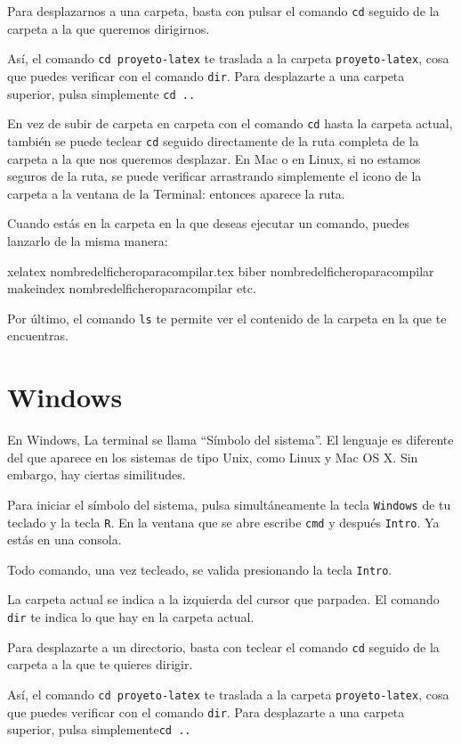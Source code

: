 Para desplazarnos a una carpeta, basta con pulsar el comando
\verb|cd| seguido de la carpeta a la que queremos dirigirnos.

Así, el comando \verb|cd proyeto-latex| te traslada a la carpeta \verb|proyeto-latex|, cosa que puedes verificar con el comando \verb|dir|. Para desplazarte a una carpeta superior, pulsa simplemente \verb|cd ..|

En vez de subir de carpeta en carpeta con el comando \verb|cd| hasta la carpeta actual, también se puede teclear \verb|cd| seguido directamente de la ruta completa de la carpeta a la que nos queremos desplazar. En Mac o en Linux, si no estamos seguros de la ruta, se puede verificar arrastrando simplemente el icono de la carpeta a la ventana de la Terminal: entonces aparece la ruta.

Cuando estás en la carpeta en la que deseas ejecutar un comando, puedes lanzarlo de la misma manera:

\begin{bashcode}
xelatex nombredelficheroparacompilar.tex
biber nombredelficheroparacompilar
makeindex nombredelficheroparacompilar
etc.
\end{bashcode}

Por último, el comando \verb|ls| te permite ver el contenido de la carpeta en la que te encuentras.

\section{Windows}
En Windows, La terminal se llama \enquote{Símbolo del sistema}. El lenguaje es diferente del que aparece en los sistemas de tipo Unix, como 
Linux y Mac OS X. Sin embargo, hay ciertas similitudes.

Para iniciar el símbolo del sistema, pulsa simultáneamente la tecla \verb|Windows| de tu teclado y la tecla \verb|R|. En la ventana que se abre escribe \verb|cmd| y después
\verb|Intro|. Ya estás en una consola.

Todo comando, una vez tecleado, se valida presionando la tecla \verb|Intro|.

La carpeta actual se indica a la izquierda del cursor que parpadea. El comando \verb|dir| te indica lo que hay en la carpeta actual.

Para desplazarte a un directorio, basta con teclear el comando
\verb|cd| seguido de la carpeta a la que te quieres dirigir.

Así, el comando \verb|cd proyeto-latex| te traslada a la carpeta \verb|proyeto-latex|, cosa que puedes verificar con el comando \verb|dir|. Para desplazarte a una carpeta superior, pulsa simplemente\verb|cd ..|

